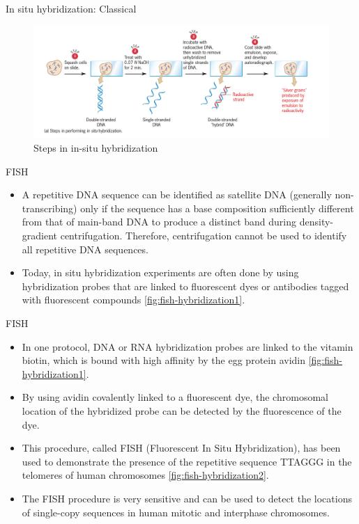 \documentclass[ignorenonframetext,aspectratio=169]{beamer}
\providecommand{\tightlist}{%
  \setlength{\itemsep}{0pt}\setlength{\parskip}{0pt}}
\begin{document}
\begin{frame}{In situ hybridization: Classical}
\protect\hypertarget{in-situ-hybridization-classical}{}

\begin{figure}
\includegraphics[width=0.65\linewidth]{./../images/insitu_hybrid_steps} \caption{Steps in in-situ hybridization}\label{fig:insitu-hybridization}
\end{figure}

\end{frame}

\begin{frame}{FISH}
\protect\hypertarget{fish}{}

\begin{itemize}
\tightlist
\item
  A repetitive DNA sequence can be identified as satellite DNA
  (generally non-transcribing) only if the sequence has a base
  composition sufficiently different from that of main-band DNA to
  produce a distinct band during density-gradient centrifugation.
  Therefore, centrifugation cannot be used to identify all repetitive
  DNA sequences.
\item
  Today, in situ hybridization experiments are often done by using
  hybridization probes that are linked to fluorescent dyes or antibodies
  tagged with fluorescent compounds \ref{fig:fish-hybridization1}.
\end{itemize}

\end{frame}

\begin{frame}{FISH}
\protect\hypertarget{fish-1}{}

\begin{itemize}
\tightlist
\item
  In one protocol, DNA or RNA hybridization probes are linked to the
  vitamin biotin, which is bound with high affinity by the egg protein
  avidin \ref{fig:fish-hybridization1}.
\item
  By using avidin covalently linked to a fluorescent dye, the
  chromosomal location of the hybridized probe can be detected by the
  fluorescence of the dye.
\item
  This procedure, called FISH (Fluorescent In Situ Hybridization), has
  been used to demonstrate the presence of the repetitive sequence
  TTAGGG in the telomeres of human chromosomes
  \ref{fig:fish-hybridization2}.
\item
  The FISH procedure is very sensitive and can be used to detect the
  locations of single-copy sequences in human mitotic and interphase
  chromosomes.
\end{itemize}

\end{frame}
\end{document}
